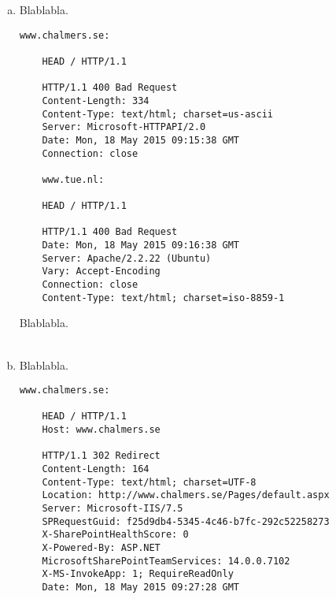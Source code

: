\documentclass[a4paper,9pt,fleqn]{article}
\begin{document}
\begin{enumerate}[{Task} 1]
\begin{enumerate}[a)]
RequiredReadOnly means that it opens in Read-Only mode.

\begin{lstlisting}
	www.tue.nl:

	HEAD / HTTP/1.0

	HTTP/1.1 301 Moved Permanently
	Date: Mon, 18 May 2015 08:24:17 GMT
	Server: Apache/2.2.22 (Ubuntu)
	X-Powered-By: PHP/5.3.10-1ubuntu3.18
	Location: http://www.tue.nl/
	Vary: Accept-Encoding
	Content-Type: text/html


	Connection closed by foreign host.
\end{lstlisting}

{\outp www.tue.nl} is using the web server type {\outp Apache/2.2.22 (Ubuntu)}.
301 Move Permanently means that the resource we are requesting has been redirected
to a new URL. The new URL is specified in the Location field. In this case www.tue.nl
is redirecting to http://www.tue.nl/. The Vary field specifies which fields of the
request header to take into account when trying to find the right object in the cache.
\\
\\
\item 
Blablabla.

\begin{lstlisting}
www.chalmers.se:

	HEAD / HTTP/1.1

	HTTP/1.1 400 Bad Request
	Content-Length: 334
	Content-Type: text/html; charset=us-ascii
	Server: Microsoft-HTTPAPI/2.0
	Date: Mon, 18 May 2015 09:15:38 GMT
	Connection: close

	www.tue.nl:

	HEAD / HTTP/1.1

	HTTP/1.1 400 Bad Request
	Date: Mon, 18 May 2015 09:16:38 GMT
	Server: Apache/2.2.22 (Ubuntu)
	Vary: Accept-Encoding
	Connection: close
	Content-Type: text/html; charset=iso-8859-1
\end{lstlisting}
Blablabla.
\\
\\
\item 
Blablabla.

\begin{lstlisting}
www.chalmers.se:

	HEAD / HTTP/1.1
	Host: www.chalmers.se

	HTTP/1.1 302 Redirect
	Content-Length: 164
	Content-Type: text/html; charset=UTF-8
	Location: http://www.chalmers.se/Pages/default.aspx
	Server: Microsoft-IIS/7.5
	SPRequestGuid: f25d9db4-5345-4c46-b7fc-292c52258273
	X-SharePointHealthScore: 0
	X-Powered-By: ASP.NET
	MicrosoftSharePointTeamServices: 14.0.0.7102
	X-MS-InvokeApp: 1; RequireReadOnly
	Date: Mon, 18 May 2015 09:27:28 GMT


\end{lstlisting}
\end{enumerate}
\end{enumerate}
\end{document}

